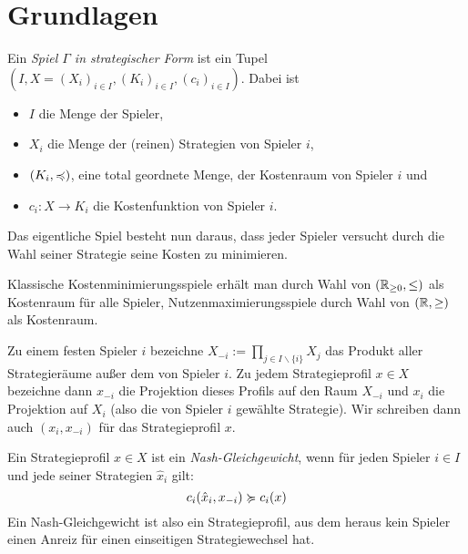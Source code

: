 \section{Grundlagen}\label{sec:Grundlagen}

\begin{defn}
	Ein \emph{Spiel $\Gamma$ in strategischer Form} ist ein Tupel $(I, X = (X_i)_{i \in I}, (K_i)_{i\in I}, (c_i)_{i\in I})$. Dabei ist
	\begin{itemize}
		\item $I$ die Menge der Spieler,
		\item $X_i$ die Menge der (reinen) Strategien von Spieler $i$,
		\item $(K_i, \preccurlyeq)$, eine total geordnete Menge, der Kostenraum von Spieler $i$ und
		\item $c_i: X \to K_i$ die Kostenfunktion von Spieler $i$.
	\end{itemize}
	Das eigentliche Spiel besteht nun daraus, dass jeder Spieler versucht durch die Wahl seiner Strategie seine Kosten zu minimieren.
\end{defn}

\begin{beob}
	Klassische Kostenminimierungsspiele erhält man durch Wahl von $(\mathbb{R}_{\geq 0}, \leq)$ als Kostenraum für alle Spieler, Nutzenmaximierungsspiele durch Wahl von $(\mathbb{R}, \geq)$ als \glqq Kosten\grqq raum.
\end{beob}

\begin{notation}
	Zu einem festen Spieler $i$ bezeichne $X_{-i} := \prod_{j \in I\backslash\{i\}} X_j$ das Produkt aller Strategieräume außer dem von Spieler $i$. Zu jedem Strategieprofil $x \in X$ bezeichne dann $x_{-i}$ die Projektion dieses Profils auf den Raum $X_{-i}$ und $x_i$ die Projektion auf $X_i$ (also die von Spieler $i$ gewählte Strategie). Wir schreiben dann auch $(x_i, x_{-i})$ für das Strategieprofil $x$.
\end{notation}

\begin{defn}
	Ein Strategieprofil $x \in X$ ist ein \emph{Nash-Gleichgewicht}, wenn für jeden Spieler $i \in I$ und jede seiner Strategien $\hat{x}_i$ gilt:
		\[c_i(\hat{x}_i, x_{-i}) \succcurlyeq c_i(x)\]
	Ein Nash-Gleichgewicht ist also ein Strategieprofil, aus dem heraus kein Spieler einen Anreiz für einen einseitigen Strategiewechsel hat.	
\end{defn}

